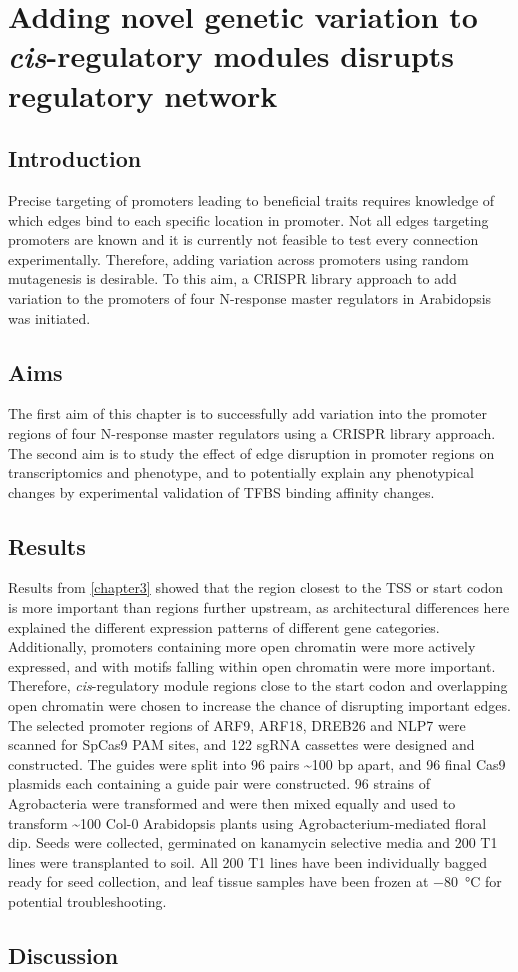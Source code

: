 \documentclass[../main.tex]{subfiles}
\begin{document}
\chapter{Adding novel genetic variation to \textit{cis}\hyp{}regulatory modules disrupts regulatory network}\label{chapter7}
\section{Introduction}\label{chapter7:introduction}

Precise targeting of promoters leading to beneficial traits requires knowledge of which edges bind to each specific location in promoter.
Not all edges targeting promoters are known and it is currently not feasible to test every connection experimentally.
Therefore, adding variation across promoters using random mutagenesis is desirable.
To this aim, a CRISPR library approach to add variation to the promoters of four N-response master regulators in Arabidopsis was initiated.
\section{Aims}\label{chapter7:aims}
The first aim of this chapter is to successfully add variation into the promoter regions of four N\hyp{}response master regulators using a CRISPR library approach.
The second aim is to study the effect of edge disruption in promoter regions on transcriptomics and phenotype, and to potentially explain any phenotypical changes by experimental validation of TFBS binding affinity changes.

\section{Results}\label{chapter7:results}
Results from \autoref{chapter3} showed that the region closest to the TSS or start codon is more important than regions further upstream, as architectural differences here explained the different expression patterns of different gene categories.
Additionally, promoters containing more open chromatin were more actively expressed, and with motifs falling within open chromatin were more important.
Therefore, \textit{cis}\hyp{}regulatory module regions close to the start codon and overlapping open chromatin were chosen to increase the chance of disrupting important edges.
The selected promoter regions of ARF9, ARF18, DREB26 and NLP7 were scanned for SpCas9 PAM sites, and 122 sgRNA cassettes were designed and constructed.
The guides were split into 96 pairs \textasciitilde{}100 bp apart, and 96 final Cas9 plasmids each containing a guide pair were constructed.
96 strains of Agrobacteria were transformed and were then mixed equally and used to transform \textasciitilde{}100 Col-0 Arabidopsis plants using Agrobacterium\hyp{}mediated floral dip.
Seeds were collected, germinated on kanamycin selective media and 200 T1 lines were transplanted to soil.
All 200 T1 lines have been individually bagged ready for seed collection, and leaf tissue samples have been frozen at \SI{-80}{\degreeCelsius} for potential troubleshooting.

\section{Discussion}\label{chapter7:discussion}
\end{document}
